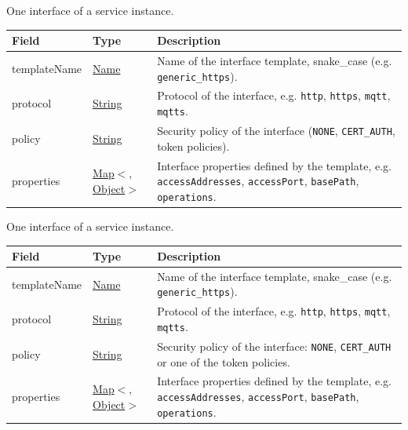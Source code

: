 \documentclass[a4paper]{arrowhead}
\newcommand{\pref}[1]{{\textcolor{ArrowheadGrey}{\hyperref[sec:model:primitives:#1]{#1}}}}
\begin{document}

One interface of a service instance.


\noindent\begin{tabularx}{\textwidth}{| >{\raggedright\arraybackslash}p{3.9cm} | >{\raggedright\arraybackslash\small}p{5.3cm} | X |} \hline
\rowcolor{gray!33} Field & Type & Description \\ \hline
template\allowbreak{}Name & \pref{Name} & Name of the interface template, snake\_case (e.g. \texttt{generic\_\allowbreak{}https}). \\ \hline
protocol & \pref{String} & Protocol of the interface, e.g. \texttt{http}, \texttt{https}, \texttt{mqtt}, \texttt{mqtts}. \\ \hline
policy & \pref{String} & Security policy of the interface (\texttt{NONE}, \texttt{CERT\_\allowbreak{}AUTH}, token policies). \\ \hline
properties & \pref{Map}$<$\allowbreak{}\pref{String}, \pref{Object}$>$ & Interface properties defined by the template, e.g. \texttt{accessAddresses}, \texttt{accessPort}, \texttt{basePath}, \texttt{operations}. \\ \hline
\end{tabularx}




One interface of a service instance.


\noindent\begin{tabularx}{\textwidth}{| >{\raggedright\arraybackslash}p{3.9cm} | >{\raggedright\arraybackslash\small}p{5.3cm} | X |} \hline
\rowcolor{gray!33} Field & Type & Description \\ \hline
template\allowbreak{}Name & \pref{Name} & Name of the interface template, snake\_case (e.g. \texttt{generic\_\allowbreak{}https}). \\ \hline
protocol & \pref{String} & Protocol of the interface, e.g. \texttt{http}, \texttt{https}, \texttt{mqtt}, \texttt{mqtts}. \\ \hline
policy & \pref{String} & Security policy of the interface: \texttt{NONE}, \texttt{CERT\_\allowbreak{}AUTH} or one of the token policies. \\ \hline
properties & \pref{Map}$<$\allowbreak{}\pref{String}, \pref{Object}$>$ & Interface properties defined by the template, e.g. \texttt{accessAddresses}, \texttt{accessPort}, \texttt{basePath}, \texttt{operations}. \\ \hline
\end{tabularx}
\end{document}
